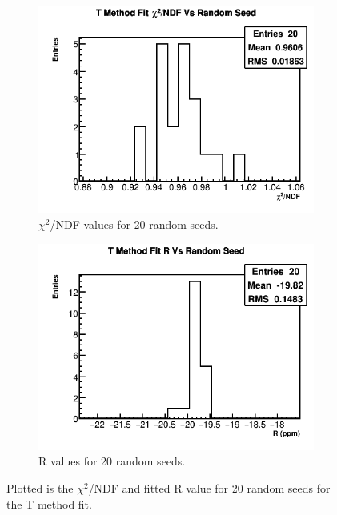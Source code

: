 	\begin{figure}[]
	\centering
	    \begin{subfigure}[t]{0.45\textwidth}
		    \centering
			\includegraphics[width=\textwidth]{TMethod_Chi2NDF_Vs_Iter_Canv_hist}
		    \caption{$\chi^{2}$/NDF values for 20 random seeds.}
	    \end{subfigure}
	    \begin{subfigure}[t]{0.45\textwidth}
		    \centering
			\includegraphics[width=\textwidth]{TMethod_R_Vs_Iter_Canv_hist.png}
		    \caption{R values for 20 random seeds.}
		\label{Subfig:RVsRandomSeedTMethod}
	    \end{subfigure}%
	\caption[RandomSeedsTMethod]{Plotted is the $\chi^{2}$/NDF and fitted R value for 20 random seeds for the T method fit.}
	\label{fig:RandomSeedsTMethod}
	\end{figure}

